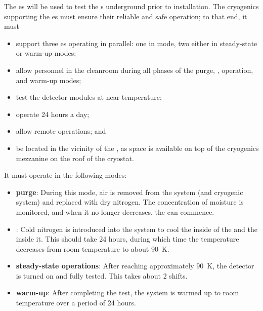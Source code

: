 \label{sec:fdsp-tc-cryocoldbox}


The  \coldbox{}es will be used to test the s underground prior to installation.  
The cryogenics supporting the \coldbox{}es  must ensure their reliable and safe operation; to that end, it must
\begin{itemize}
\setlength\itemsep{1mm}
\setlength{\parsep}{1mm}
\setlength{\itemsep}{-5mm}
\item support three \coldbox{}es operating in parallel: 
one in \cooldown mode, two either in steady-state or warm-up modes;
\item allow personnel in the cleanroom during all phases of the purge, \cooldown, operation, and warm-up modes; 
\item test the detector modules at near  temperature;
\item operate 24 hours a day;
\item allow remote operations; and 
\item be located in the vicinity of the , as space is available on top of the cryogenics mezzanine on the roof of the cryostat.
\end{itemize}

It must operate in the following modes: 

\begin{itemize}
\setlength\itemsep{1mm}
\setlength{\parsep}{1mm}
\setlength{\itemsep}{-5mm}
\item \textbf{purge}: During this mode, air is removed from the system (\coldbox and cryogenic system) and replaced with dry nitrogen. The concentration of moisture is monitored, and when it no longer decreases, the \cooldown can commence.
\item \textbf{\cooldown}: Cold nitrogen is introduced into the system to cool the inside of the \coldbox and the  inside it. 
This should take 24 hours, during which time the temperature decreases from room temperature to about \SI{90}{K}. 
\item \textbf{steady-state operations}: After reaching approximately \SI{90}{K}, 
the detector is turned on and fully tested. 
This takes about 2 shifts.
\item \textbf{warm-up}: After completing the test, the system is
warmed up to room temperature over a period of 24 hours. 
\end{itemize}

